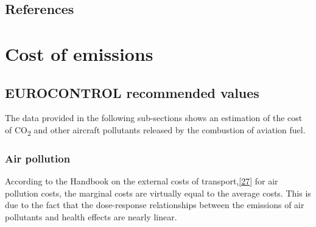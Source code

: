 \documentclass[
  11pt,
  a4paper,
]{book}
\begin{document}
\hypertarget{references-7}{%
\section{References}\label{references-7}}

\hypertarget{sec-cost-of-emissions}{%
\chapter{Cost of emissions}\label{sec-cost-of-emissions}}

\hypertarget{eurocontrol-recommended-values-5}{%
\section{EUROCONTROL recommended
values}\label{eurocontrol-recommended-values-5}}

The data provided in the following sub-sections shows an estimation of
the cost of CO\textsubscript{2} and other aircraft pollutants released
by the combustion of aviation fuel.

\hypertarget{air-pollution}{%
\subsection{Air pollution}\label{air-pollution}}

According to the Handbook on the external costs of
transport,\protect\hyperlink{ref-ecdgmove2019}{{[}27{]}} for air
pollution costs, the marginal costs are virtually equal to the average
costs. This is due to the fact that the dose-response relationships
between the emissions of air pollutants and health effects are nearly
linear.
\end{document}
